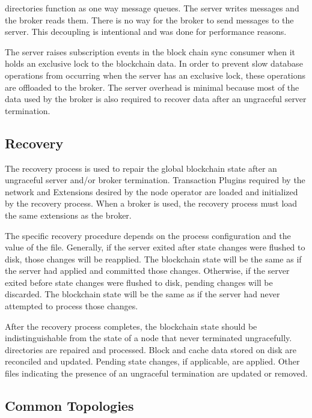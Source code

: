 directories function as one way message queues.
The server writes messages and the broker reads them.
There is no way for the broker to send messages to the server.
This decoupling is intentional and was done for performance reasons.

The server raises subscription events in the block chain sync consumer  when it holds an exclusive lock to the blockchain data.
In order to prevent slow database operations from occurring when the server has an exclusive lock, these operations are offloaded to the broker.
The server overhead is minimal because most of the data used by the broker is also required to recover data after an ungraceful server termination.

\subsection{Recovery}

The recovery process is used to repair the global blockchain state after an ungraceful server and/or broker termination.
Transaction Plugins required by the network and \codenamespace Extensions desired by the node operator are loaded and initialized by the recovery process.
When a broker is used, the recovery process must load the same extensions as the broker.

The specific recovery procedure depends on the process configuration and the value of the  file.
Generally, if the server exited after state changes were flushed to disk, those changes will be reapplied.
The blockchain state will be the same as if the server had applied and committed those changes.
Otherwise, if the server exited before state changes were flushed to disk, pending changes will be discarded.
The blockchain state will be the same as if the server had never attempted to process those changes.

After the recovery process completes, the blockchain state should be indistinguishable from the state of a node that never terminated ungracefully.
 directories are repaired and processed.
Block and cache data stored on disk are reconciled and updated.
Pending state changes, if applicable, are applied.
Other files indicating the presence of an ungraceful termination are updated or removed.

\subsection{Common Topologies}

